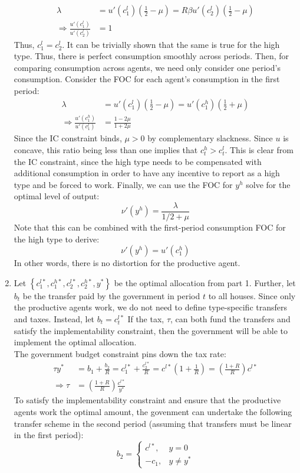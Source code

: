 \documentclass{article}
\begin{document}
\begin{enumerate}
		\begin{align*}
			\lambda 	&= u'(c_1^l)\left(\frac{1}{2} - \mu\right) = R\beta u'(c_2^l)\left(\frac{1}{2} - \mu\right)	\\
			\Rightarrow \frac{u'(c_1^l)}{u'(c_2^l)} &= 1
		\end{align*}
		Thus, ${c_1^l=c_2^l}$. It can be trivially shown that the same is true for the high type. Thus, there is perfect consumption smoothly across periods. Then, for comparing consumption across agents, we need only consider one period's consumption. Consider the FOC for each agent's consumption in the first period:
		\begin{align*}
			\lambda 	&= u'(c_1^l)\left(\frac{1}{2} - \mu\right) = u'(c_1^h)\left(\frac{1}{2} + \mu\right)	\\
			\Rightarrow \frac{u'(c_1^h)}{u'(c_1^l)} &= \frac{1 - 2\mu}{1 + 2\mu}
		\end{align*}
		Since the IC constraint binds, ${\mu>0}$ by complementary slackness. Since $u$ is concave, this ratio being less than one implies that ${c^h_t>c^l_t}$. This is clear from the IC constraint, since the high type needs to be compensated with additional consumption in order to have any incentive to report as a high type and be forced to work. Finally, we can use the FOC for $y^h$ solve for the optimal level of output:
		\[
			\nu'(y^h) = \frac{\lambda}{1/2 + \mu}
		\]
		Note that this can be combined with the first-period consumption FOC for the high type to derive:
		\[
			\nu'(y^h) = u'(c_1^h)
		\]
		In other words, there is no distortion for the productive agent.
		
	\item Let ${\left\{c_1^{l*},c_1^{h*},c_2^{l*},c_2^{h*},y^*\right\}}$ be the optimal allocation from part 1. Further, let $b_t$ be the transfer paid by the government in period $t$ to all houses. Since only the productive agents work, we do not need to define type-specific transfers and taxes. Instead, let ${b_t=c_t^{l*}}$ If the tax, $\tau$, can both fund the transfers and satisfy the implementability constraint, then the government will be able to implement the optimal allocation.
	\medskip \\
	The government budget constraint pins down the tax rate:
	\begin{align*}
				\tau y^* &= b_1 + \frac{b_2}{R} = c_1^{l*} + \frac{c_2^{l*}}{R} = c^{l*}\left(1 + \frac{1}{R}\right) = \left(\frac{1 + R}{R}\right)c^{l*}	\\
		\Rightarrow \tau &= \left(\frac{1 + R}{R}\right)\frac{c^{l*}}{y^*}
	\end{align*}
	To satisfy the implementability constraint and ensure that the productive agents work the optimal amount, the govenment can undertake the following transfer scheme in the second period (assuming that transfers must be linear in the first period):
	\[
		b_2 =	\begin{cases}
					c^{l*},	& y=0			\\
					-c_1, 	& y\neq y^*
				\end{cases}
	\]
	
	\end{enumerate}
\end{document}
